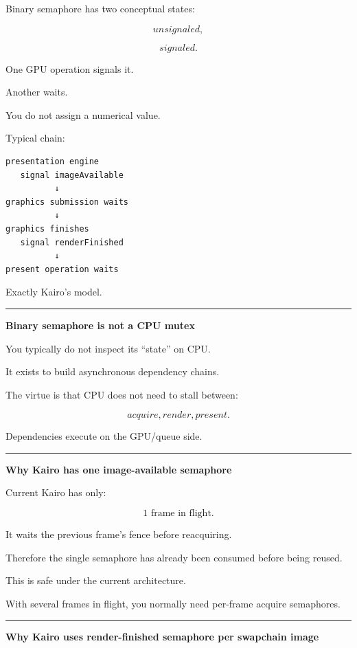 Binary semaphore has two conceptual states:

\[
unsignaled,
\]

\[
signaled.
\]

One GPU operation signals it.

Another waits.

You do not assign a numerical value.

Typical chain:

\begin{verbatim}
presentation engine
   signal imageAvailable
          ↓
graphics submission waits
          ↓
graphics finishes
   signal renderFinished
          ↓
present operation waits
\end{verbatim}

Exactly Kairo's model.

\begin{center}\rule{0.5\linewidth}{0.5pt}\end{center}

\textbf{Binary semaphore is not a CPU mutex}

You typically do not inspect its ``state'' on CPU.

It exists to build asynchronous dependency chains.

The virtue is that CPU does not need to stall between:

\[
acquire,
render,
present.
\]

Dependencies execute on the GPU/queue side.

\begin{center}\rule{0.5\linewidth}{0.5pt}\end{center}

\textbf{Why Kairo has one image-available semaphore}

Current Kairo has only:

\[
1\text{ frame in flight}.
\]

It waits the previous frame's fence before reacquiring.

Therefore the single  semaphore has already been consumed before being reused.

This is safe under the current architecture.

With several frames in flight, you normally need per-frame acquire semaphores.

\begin{center}\rule{0.5\linewidth}{0.5pt}\end{center}

\textbf{Why Kairo uses render-finished semaphore per swapchain image}

